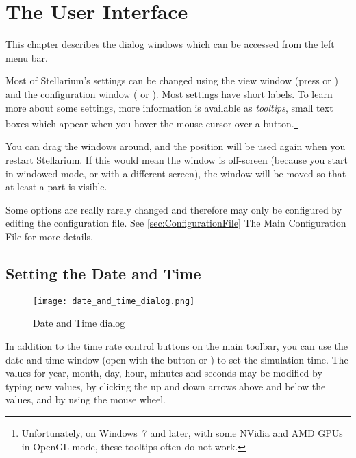 

\chapter{The User Interface}
\label{ch:gui}


This chapter describes the dialog windows which can be accessed from the left menu bar.

Most of Stellarium's settings can be changed using the view window
(press  or ) and the
configuration window ( or
). Most settings have short labels. To learn more about some
settings, more information is available as \emph{tooltips}, small text
boxes which appear when you hover the mouse cursor over a
button.\footnote{Unfortunately, on Windows~7 and later, with some NVidia
  and AMD GPUs in OpenGL mode, these tooltips often do not work.}

You can drag the
windows around, and the position will be used again when you restart
Stellarium. If this would mean the window is off-screen (because you
start in windowed mode, or with a different screen), the window will
be moved so that at least a part is visible.

Some options are really rarely changed and therefore may only be
configured by editing the configuration file.  See
\ref{sec:ConfigurationFile} The Main Configuration File for more
details.



\section{Setting the Date and Time}
\label{sec:gui:date}

\begin{figure}[htbp]
\centering\texttt{[image: date\_and\_time\_dialog.png]}
\caption{Date and Time dialog}
\label{fig:gui:date}
\end{figure}

In addition to the time rate control buttons on the main toolbar, you
can use the date and time window (open with the  
button or ) to set the simulation time. The values
for year, month, day, hour, minutes and seconds may be modified by
typing new values, by clicking the up and down arrows above and below
the values, and by using the mouse wheel.

